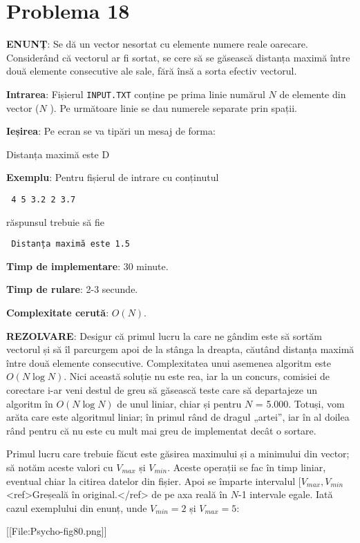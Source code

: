 \section{Problema 18}

{\bf ENUNȚ}: Se dă un vector nesortat cu elemente numere reale oarecare. Considerând că vectorul ar fi sortat, se cere să se găsească distanța maximă între două elemente consecutive ale sale, fără însă a sorta efectiv vectorul.

{\bf Intrarea}: Fișierul {\tt INPUT.TXT} conține pe prima linie numărul $N$ de elemente din vector ($N$ ). Pe următoare linie se dau numerele separate prin spații.

{\bf Ieșirea}: Pe ecran se va tipări un mesaj de forma:

Distanța maximă este D

{\bf Exemplu}: Pentru fișierul de intrare cu conținutul

\texttt{
4
5 3.2 2 3.7
}

răspunsul trebuie să fie

\texttt{
Distanța maximă este 1.5
}

{\bf Timp de implementare}: 30 minute.

{\bf Timp de rulare}: 2-3 secunde.

{\bf Complexitate cerută}: $O(N)$.

{\bf REZOLVARE}: Desigur că primul lucru la care ne gândim este să sortăm vectorul și să îl parcurgem apoi de la stânga la dreapta, căutând distanța maximă între două elemente consecutive. Complexitatea unui asemenea algoritm este $O(N \log N)$. Nici această soluție nu este rea, iar la un concurs, comisiei de corectare i-ar veni destul de greu să găsească teste care să departajeze un algoritm în $O(N \log N)$ de unul liniar, chiar și pentru $N$ = 5.000. Totuși, vom arăta care este algoritmul liniar; în primul rând de dragul „artei”, iar în al doilea rând pentru că nu este cu mult mai greu de implementat decât o sortare.

Primul lucru care trebuie făcut este găsirea maximului și a minimului din vector; să notăm aceste valori cu $V_{\mathit{max}}$ și $V_{\mathit{min}}$. Aceste operații se fac în timp liniar, eventual chiar la citirea datelor din fișier. Apoi se împarte intervalul $[V_{\mathit{max}}, V_{\mathit{min}}$<ref>Greșeală în original.</ref> de pe axa reală în $N$-1 intervale egale. Iată cazul exemplului din enunț, unde $V_{\mathit{min}} = 2$ și $V_{\mathit{max}} = 5$:

[[File:Psycho-fig80.png]]

